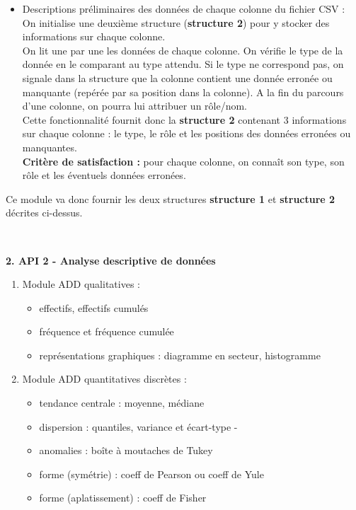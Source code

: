 \begin{description}[style=unboxed,leftmargin=0.2cm]
\begin{enumerate}
\begin{itemize}
						\item Descriptions préliminaires des données de chaque colonne du fichier CSV :\\
						On initialise une deuxième structure (\textbf{structure 2}) pour y stocker des informations sur chaque colonne.\\
						On lit une par une les données de chaque colonne. On vérifie le type de la donnée en le comparant au type attendu. Si le type ne correspond pas, on signale dans la structure que la colonne contient une donnée erronée ou manquante (repérée par sa position dans la colonne). A la fin du parcours d'une colonne, on pourra lui attribuer un rôle/nom.\\
						Cette fonctionnalité fournit donc la \textbf{structure 2} contenant 3 informations sur chaque colonne : le type, le rôle et les positions des données erronées ou manquantes.\\
						\textbf{Critère de satisfaction : } pour chaque colonne, on connaît son type, son rôle et les éventuels données erronées.
					\end{itemize}
					Ce module va donc fournir les deux structures \textbf{structure 1} et \textbf{structure 2} décrites ci-dessus.
				\end{enumerate}
				~\\
				\item\textbf{2. API 2 - Analyse descriptive de données}
				\begin{enumerate}
					\item Module ADD qualitatives :
						\begin{itemize}
						\item effectifs, effectifs cumulés
						\item fréquence et fréquence cumulée
						\item représentations graphiques : diagramme en secteur, histogramme
						\end{itemize}
					\item Module ADD quantitatives discrètes :
						\begin{itemize}
						\item tendance centrale : moyenne, médiane
						\item dispersion : quantiles, variance et écart-type
	-					\item anomalies : boîte à moutaches de Tukey
						\item forme (symétrie) : coeff de Pearson ou coeff de Yule
						\item forme (aplatissement) : coeff de Fisher

\end{itemize}
\end{enumerate}
\end{description}
